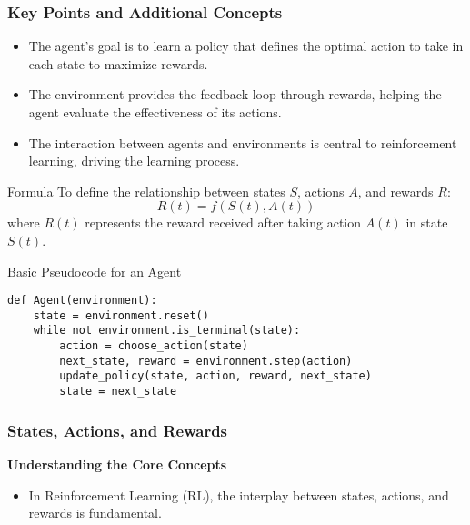 \documentclass[aspectratio=169]{beamer}
\begin{document}
\begin{frame}[fragile]
    \frametitle{Key Points and Additional Concepts}

    \begin{itemize}
        \item The agent's goal is to learn a policy that defines the optimal action to take in each state to maximize rewards.
        \item The environment provides the feedback loop through rewards, helping the agent evaluate the effectiveness of its actions.
        \item The interaction between agents and environments is central to reinforcement learning, driving the learning process.
    \end{itemize}
    
    \begin{block}{Formula}
        To define the relationship between states \( S \), actions \( A \), and rewards \( R \):
        \begin{equation}
            R(t) = f(S(t), A(t)) 
        \end{equation}
        where \( R(t) \) represents the reward received after taking action \( A(t) \) in state \( S(t) \).
    \end{block}

    \begin{block}{Basic Pseudocode for an Agent}
    \begin{lstlisting}
def Agent(environment):
    state = environment.reset()
    while not environment.is_terminal(state):
        action = choose_action(state)
        next_state, reward = environment.step(action)
        update_policy(state, action, reward, next_state)
        state = next_state
    \end{lstlisting}
    \end{block}
\end{frame}

\begin{frame}[fragile]
    \frametitle{States, Actions, and Rewards}
    \textbf{Understanding the Core Concepts}
    \begin{itemize}
        \item In Reinforcement Learning (RL), the interplay between states, actions, and rewards is fundamental.
    \end{itemize}
\end{frame}
\end{document}
